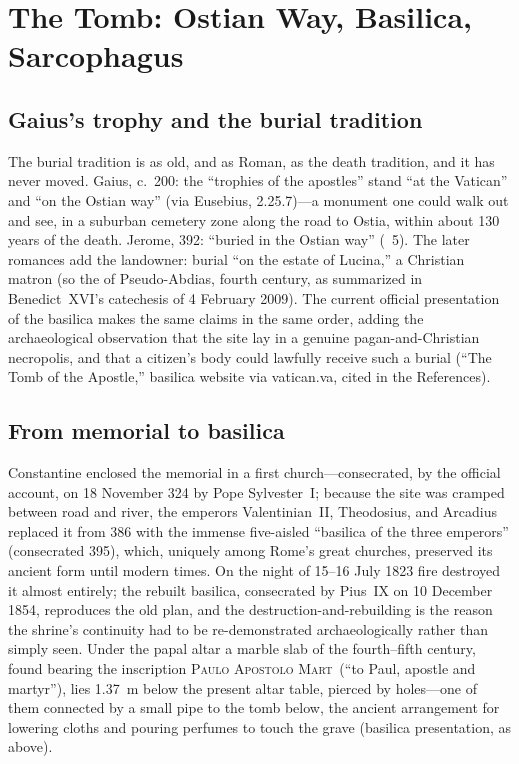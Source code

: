 \section{The Tomb: Ostian Way, Basilica, Sarcophagus}

\subsection{Gaius's trophy and the burial tradition}

The burial tradition is as old, and as Roman, as the death tradition, and
it has never moved. Gaius, c.~200: the ``trophies of the apostles'' stand
``at the Vatican'' and ``on the Ostian way'' (via Eusebius,  2.25.7)---a monument one could walk out and see, in a suburban
cemetery zone along the road to Ostia, within about 130 years of the
death. Jerome, 392: ``buried in the Ostian way'' (~5). The later romances add the landowner: burial ``on the
estate of Lucina,'' a Christian matron (so the  of
Pseudo-Abdias, fourth century, as summarized in Benedict~XVI's catechesis
of 4 February 2009). The current official presentation of the basilica
makes the same claims in the same order, adding the archaeological
observation that the site lay in a genuine pagan-and-Christian necropolis,
and that a citizen's body could lawfully receive such a burial
(``The Tomb of the Apostle,'' basilica website via vatican.va, cited in
the References).

\subsection{From memorial to basilica}

Constantine enclosed the memorial in a first church---consecrated,
by the official account, on 18 November 324 by Pope Sylvester~I; because
the site was cramped between road and river, the emperors Valentinian~II,
Theodosius, and Arcadius replaced it from 386 with the immense five-aisled
``basilica of the three emperors'' (consecrated 395), which, uniquely
among Rome's great churches, preserved its ancient form until modern
times. On the night of 15--16 July
1823 fire destroyed it almost entirely; the rebuilt basilica, consecrated
by Pius~IX on 10 December 1854, reproduces the old plan, and the destruction-and-rebuilding is
the reason the shrine's continuity had to be re-demonstrated
archaeologically rather than simply seen. Under the papal altar a marble
slab of the fourth--fifth century, found bearing the inscription
\textsc{Paulo Apostolo Mart}\ (``to Paul, apostle and martyr''), lies
1.37~m below the present altar table, pierced by holes---one of them
connected by a small pipe to the tomb below, the ancient arrangement for
lowering cloths and pouring perfumes to touch the grave (basilica
presentation, as above).

